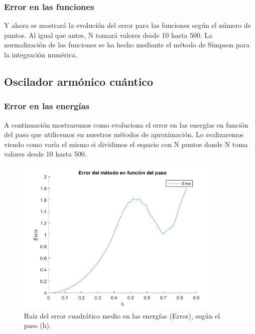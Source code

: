 \documentclass[12pt]{article}
\begin{document}
    \subsubsection{Error en las funciones}

    Y ahora se mostrará la evolución del error para las funciones según el número de puntos. Al igual que antes, N tomará valores desde 10 hasta 500. La normalización de las funciones se ha hecho mediante el método de Simpson para la integración numérica.
    

    
    \subsection{Oscilador armónico cuántico}

    \subsubsection{Error en las energías}

    A continuación mostraremos como evoluciona el error en las energías en función del paso que utilicemos en nuestros métodos de aproximación. Lo realizaremos viendo como varía el mismo si dividimos el espacio con N puntos donde N toma valores desde 10 hasta 500.
    
    \begin{figure}[H]
        \centering
        \includegraphics[width=0.9\textwidth]{errorpasoN500.jpg}
        \caption{Raíz del error cuadrático medio en las energías (Error), según el paso (h).}
        \end{figure} 
        
\end{document}
